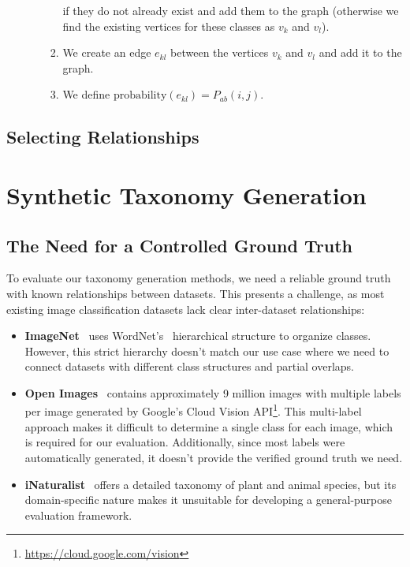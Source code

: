 \begin{enumerate}
\begin{enumerate}
\begin{enumerate}
                              if they do not already exist and add them to the graph
                              (otherwise we find the existing vertices for these classes as $v_k$ and $v_l$).
                        \item We create an edge $e_{kl}$ between the vertices $v_k$ and $v_l$ and add it to the graph.
                        \item We define $\text{probability}(e_{kl}) = P_{ab}(i, j)$.
                    \end{enumerate}
          \end{enumerate}
\end{enumerate}

\subsection{Selecting Relationships}


\section{Synthetic Taxonomy Generation}

\subsection{The Need for a Controlled Ground Truth}

To evaluate our taxonomy generation methods, we need a reliable ground truth with known relationships between datasets. This presents a challenge, as most existing image classification datasets lack clear inter-dataset relationships:

\begin{itemize}
    \item \textbf{ImageNet}~\cite{deng_imagenet_2009,russakovsky_imagenet_2015}
          uses WordNet's~\cite{fellbaum_wordnet_1998} hierarchical structure to organize classes.
          However, this strict hierarchy doesn't match our use case where we need to connect
          datasets with different class structures and partial overlaps.

    \item \textbf{Open Images}~\cite{kuznetsova_open_2020} contains approximately 9 million
          images with multiple labels per image generated by Google's Cloud Vision API\footnote{\url{https://cloud.google.com/vision}}.
          This multi-label approach makes it difficult to determine a single class for each image,
          which is required for our evaluation. Additionally, since most labels were automatically
          generated, it doesn't provide the verified ground truth we need.

    \item \textbf{iNaturalist}~\cite{horn_inaturalist_2018} offers a detailed taxonomy of
          plant and animal species, but its domain-specific nature makes it unsuitable
          for developing a general-purpose evaluation framework.
\end{itemize}

